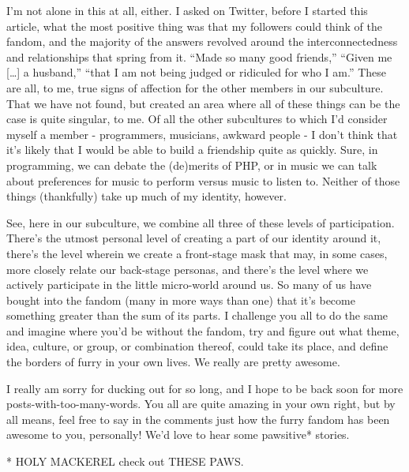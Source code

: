 I'm not alone in this at all, either. I asked on Twitter, before I started this article, what the most positive thing was that my followers could think of the fandom, and the majority of the answers revolved around the interconnectedness and relationships that spring from it. ``Made so many good friends,'' ``Given me {[}\ldots{}{]} a husband,'' ``that I am not being judged or ridiculed for who I am.'' These are all, to me, true signs of affection for the other members in our subculture. That we have not found, but created an area where all of these things can be the case is quite singular, to me. Of all the other subcultures to which I'd consider myself a member - programmers, musicians, awkward people - I don't think that it's likely that I would be able to build a friendship quite as quickly. Sure, in programming, we can debate the (de)merits of PHP, or in music we can talk about preferences for music to perform versus music to listen to. Neither of those things (thankfully) take up much of my identity, however.

See, here in our subculture, we combine all three of these levels of participation. There's the utmost personal level of creating a part of our identity around it, there's the level wherein we create a front-stage mask that may, in some cases, more closely relate our back-stage personas, and there's the level where we actively participate in the little micro-world around us. So many of us have bought into the fandom (many in more ways than one) that it's become something greater than the sum of its parts. I challenge you all to do the same and imagine where you'd be without the fandom, try and figure out what theme, idea, culture, or group, or combination thereof, could take its place, and define the borders of furry in your own lives. We really are pretty awesome.

I really am sorry for ducking out for so long, and I hope to be back soon for more posts-with-too-many-words. You all are quite amazing in your own right, but by all means, feel free to say in the comments just how the furry fandom has been awesome to you, personally! We'd love to hear some pawsitive* stories.

* HOLY MACKEREL check out THESE PAWS.
